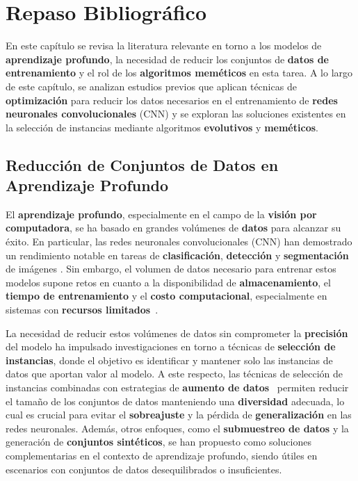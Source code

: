 \chapter{Repaso Bibliográfico}\label{ch:repaso-bibliografico}
En este capítulo se revisa la literatura relevante en torno a los modelos de \textbf{aprendizaje profundo}, la
necesidad de reducir los conjuntos de \textbf{datos de entrenamiento} y el rol de los \textbf{algoritmos meméticos} en
esta tarea.
A lo largo de este capítulo, se analizan estudios previos que aplican técnicas de \textbf{optimización} para reducir
los datos necesarios en el entrenamiento de \textbf{redes neuronales convolucionales} (CNN) y se exploran las
soluciones existentes en la selección de instancias mediante algoritmos \textbf{evolutivos} y \textbf{meméticos}.


\section{Reducción de Conjuntos de Datos en Aprendizaje Profundo}
\label{sec:reduccion-de-conjuntos-de-datos-en-aprendizaje-profundo}
El \textbf{aprendizaje profundo}, especialmente en el campo de la \textbf{visión por computadora}, se ha basado en
grandes volúmenes de \textbf{datos} para alcanzar su éxito.
En particular, las redes neuronales convolucionales (CNN) han demostrado un rendimiento notable en tareas de
\textbf{clasificación}, \textbf{detección} y \textbf{segmentación} de imágenes \cite{Goodfellow et al., 2016}.
Sin embargo, el volumen de datos necesario para entrenar estos modelos supone retos en cuanto a la disponibilidad de
\textbf{almacenamiento}, el \textbf{tiempo de entrenamiento} y el \textbf{costo computacional}, especialmente en
sistemas con \textbf{recursos limitados}~\cite{LeCun et al., 2015}.


La necesidad de reducir estos volúmenes de datos sin comprometer la \textbf{precisión} del modelo ha impulsado
investigaciones en torno a técnicas de \textbf{selección de instancias}, donde el objetivo es identificar y mantener
solo las instancias de datos que aportan valor al modelo.
A este respecto, las técnicas de selección de instancias combinadas con estrategias de
\textbf{aumento de datos}~\cite{Shorten & Khoshgoftaar, 2019} permiten reducir el tamaño de los conjuntos de datos
manteniendo una \textbf{diversidad} adecuada, lo cual es crucial para evitar el \textbf{sobreajuste} y la pérdida de
\textbf{generalización} en las redes neuronales.
Además, otros enfoques, como el \textbf{submuestreo de datos} y la generación de \textbf{conjuntos sintéticos}, se han
propuesto como soluciones complementarias en el contexto de aprendizaje profundo, siendo útiles en escenarios con
conjuntos de datos desequilibrados o insuficientes.


